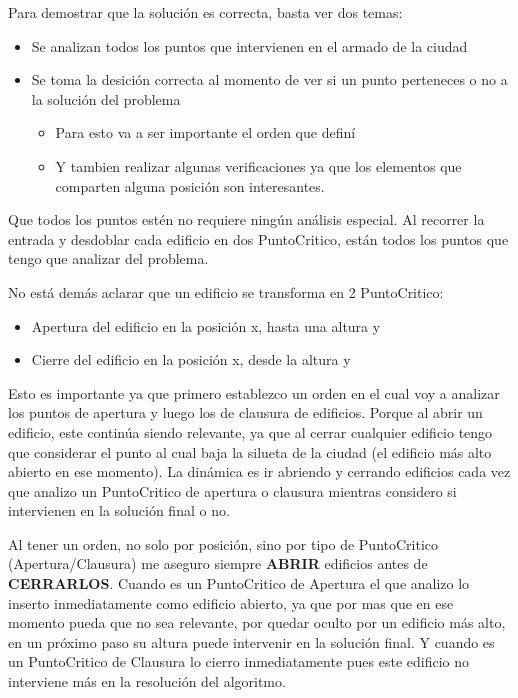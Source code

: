 Para demostrar que la solución es correcta, basta ver dos temas:

\begin{itemize}
	\item Se analizan todos los puntos que intervienen en el armado de la ciudad
	\item Se toma la desición correcta al momento de ver si un punto perteneces o no a la solución del problema
		\begin{itemize}
		\item Para esto va a ser importante el orden que definí
		\item Y tambien realizar algunas verificaciones ya que los elementos que comparten alguna posición son interesantes.
		\end{itemize}
\end{itemize}

Que todos los puntos estén no requiere ningún análisis especial. Al recorrer la entrada y desdoblar cada edificio en dos PuntoCritico, están todos los puntos que tengo que analizar del problema.

No está demás aclarar que un edificio se transforma en 2 PuntoCritico:
	\begin{itemize}
		\item Apertura del edificio en la posición x, hasta una altura y
		\item Cierre del edificio en la posición x, desde la altura y
	\end{itemize}

Esto es importante ya que primero establezco un orden en el cual voy a analizar los puntos de apertura y luego los de clausura de edificios. Porque al abrir un edificio, este continúa siendo relevante, ya que al cerrar cualquier edificio tengo que considerar el punto al cual baja la silueta de la ciudad (el edificio más alto abierto en ese momento). La dinámica es ir abriendo y cerrando edificios cada vez que analizo un PuntoCritico de apertura o clausura mientras considero si intervienen en la solución final o no.

Al tener un orden, no solo por posición, sino por tipo de PuntoCritico (Apertura/Clausura) me aseguro siempre \textbf{ABRIR} edificios antes de \textbf{CERRARLOS}. Cuando es un PuntoCritico de Apertura el que analizo lo inserto inmediatamente como edificio abierto, ya que por mas que en ese momento pueda que no sea relevante, por quedar oculto por un edificio más alto, en un próximo paso su altura puede intervenir en la solución final.
Y cuando es un PuntoCritico de Clausura lo cierro inmediatamente pues este edificio no interviene más en la resolución del algoritmo.

